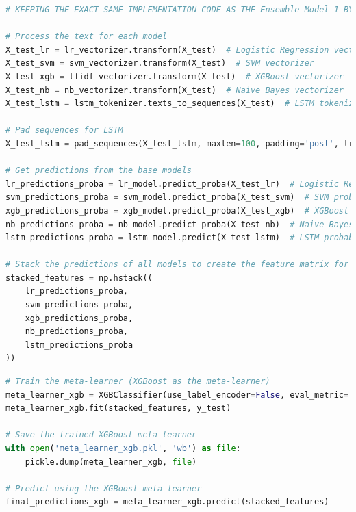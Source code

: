 \begin{tcolorbox}[colback=gray!5!white, colframe=gray!80!black, boxrule=0.5pt, title=Evaluate Meta-Learner and Ensemble Model 2]
    \begin{lstlisting}[language=Python]
# KEEPING THE EXACT SAME IMPLEMENTATION CODE AS THE Ensemble Model 1 BY IMPORTING THE NECESSARY LIBRARIES, LOADING THE MODELS, AND PREPROCESSING THE DATA

# Process the text for each model
X_test_lr = lr_vectorizer.transform(X_test)  # Logistic Regression vectorizer
X_test_svm = svm_vectorizer.transform(X_test)  # SVM vectorizer
X_test_xgb = tfidf_vectorizer.transform(X_test)  # XGBoost vectorizer
X_test_nb = nb_vectorizer.transform(X_test)  # Naive Bayes vectorizer
X_test_lstm = lstm_tokenizer.texts_to_sequences(X_test)  # LSTM tokenizer

# Pad sequences for LSTM
X_test_lstm = pad_sequences(X_test_lstm, maxlen=100, padding='post', truncating='post')

# Get predictions from the base models
lr_predictions_proba = lr_model.predict_proba(X_test_lr)  # Logistic Regression probabilities
svm_predictions_proba = svm_model.predict_proba(X_test_svm)  # SVM probabilities
xgb_predictions_proba = xgb_model.predict_proba(X_test_xgb)  # XGBoost probabilities
nb_predictions_proba = nb_model.predict_proba(X_test_nb)  # Naive Bayes probabilities
lstm_predictions_proba = lstm_model.predict(X_test_lstm)  # LSTM probabilities

# Stack the predictions of all models to create the feature matrix for the meta-learner
stacked_features = np.hstack((
    lr_predictions_proba,
    svm_predictions_proba,
    xgb_predictions_proba,
    nb_predictions_proba,
    lstm_predictions_proba
))

\end{lstlisting}
\end{tcolorbox}

\begin{tcolorbox}[colback=gray!5!white, colframe=gray!80!black, boxrule=0.5pt, title=Evaluate Meta-Learner and Ensemble Model 2]
    \begin{lstlisting}[language=Python]
# Train the meta-learner (XGBoost as the meta-learner)
meta_learner_xgb = XGBClassifier(use_label_encoder=False, eval_metric='mlogloss')
meta_learner_xgb.fit(stacked_features, y_test)

# Save the trained XGBoost meta-learner
with open('meta_learner_xgb.pkl', 'wb') as file:
    pickle.dump(meta_learner_xgb, file)

# Predict using the XGBoost meta-learner
final_predictions_xgb = meta_learner_xgb.predict(stacked_features)
\end{lstlisting}
\end{tcolorbox}
 
